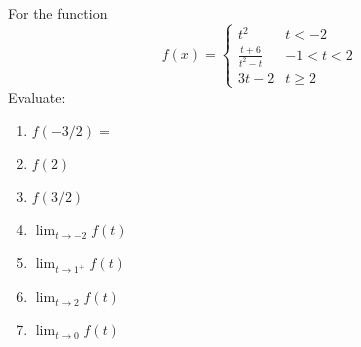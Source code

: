 \documentclass[12pt]{article}
\newenvironment{problem}[2][Problem]{\begin{trivlist}
\item[\hskip \labelsep {\bfseries #1}\hskip \labelsep {\bfseries #2.}]}{\end{trivlist}}
\begin{document}
\begin{problem}{3}
  For the function
  $$
  \displaystyle
 f(x) = \begin{cases}
    t^2 & t < -2 \\
    \displaystyle\frac{t+6}{t^2-t}   & -1<t<2 \\
    3t-2 & t\geq 2
  \end{cases}
 $$
 Evaluate:
  \begin{enumerate}[label=\roman*)]
  \item $f(-3/2) =$
  \item $f(2)$
  \item $f(3/2)$
  \item $\displaystyle \lim_{t\rightarrow -2} f(t)$
  \item $\displaystyle \lim_{t\rightarrow 1^{+}} f(t)$
  \item $\displaystyle \lim_{t\rightarrow 2} f(t)$
  \item $\displaystyle \lim_{t\rightarrow 0} f(t)$
  \end{enumerate}
\end{problem}


\end{document}
